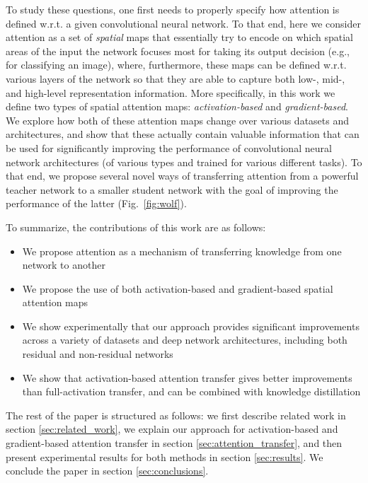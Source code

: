 \documentclass{article} \usepackage{iclr2017_conference}
\begin{document}
To study these questions, one first needs to properly specify how attention is defined  w.r.t. a given convolutional neural network. To that end, here we consider attention as a set of \emph{spatial} maps
that essentially try to encode on which spatial areas of the input the network focuses most for taking its output decision (e.g., for classifying an image), where, furthermore, these maps can be defined w.r.t. various layers of the network so that they are able to capture both low-, mid-, and high-level representation information.
More specifically, in this work we define two types of spatial attention maps:  \emph{activation-based }and \emph{gradient-based}. We explore how both of these attention maps  change over various datasets and  architectures, and show that these  actually contain valuable information that can be used for significantly improving the performance of convolutional neural network architectures  (of various types and trained for various different tasks). To that end, we propose several novel ways of transferring attention from a powerful teacher network to a smaller student network with the goal of improving the performance of the latter (Fig.~\ref{fig:wolf}).


To summarize, the contributions of this work are as follows:
\begin{itemize}
  \item We propose attention as a mechanism of transferring knowledge from one network to another
  \item We propose the use of both activation-based and gradient-based spatial attention maps
  \item We show experimentally that our approach provides significant improvements across a variety of datasets and deep network architectures, including both residual and non-residual networks
  \item We show that activation-based attention transfer gives better improvements than full-activation transfer, and can be combined with knowledge distillation
\end{itemize}

The rest of the paper is structured as follows: we first describe related work in section \ref{sec:related_work}, we  explain our approach for  activation-based and gradient-based attention transfer in section \ref{sec:attention_transfer}, and then present experimental results for both methods in section \ref{sec:results}.
We conclude the paper in section \ref{sec:conclusions}.
\end{document}
